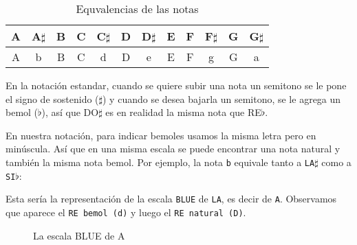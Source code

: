 \documentclass[]{article}
\begin{document}
\begin{table}[htbp]
  \centering
  \begin{tabular}{*{12}{c}}
    \toprule
    A & A$\sharp$ & B & C & C$\sharp$ & D & D$\sharp$ & E & F & F$\sharp$ & G & G$\sharp$ \\
    \midrule    
    A & b & B & C & d & D & e & E & F & g & G & a  \\    
    \bottomrule
  \end{tabular}
  \caption{Equvalencias de las notas}
  \label{tab:note-equivalences}
\end{table}

En la notación estandar, cuando se quiere subir una nota un semitono se le pone el signo de sostenido ($\sharp$) y cuando se desea bajarla un semitono, se le agrega un bemol ($\flat$), así que DO$\sharp$ es en realidad la misma nota que RE$\flat$.

En nuestra notación, para indicar bemoles usamos la misma letra pero en minúscula. Así que en una misma escala se puede encontrar una nota natural y también la misma nota bemol. Por ejemplo, la nota \texttt{b} equivale tanto a \texttt{LA$\sharp$} como a \texttt{SI$\flat$}: 

Esta sería la representación de la escala \texttt{BLUE} de \texttt{LA}, es decir de \texttt{A}. Observamos que aparece el \texttt{RE\ bemol\ (d)} y luego el \texttt{RE\ natural\ (D)}.
\begin{figure}
 \center

  \vspace{12pt}

\caption{La escala BLUE de A}
\label{fig:blue-scale-of-a}
\end{figure}
\end{document}
